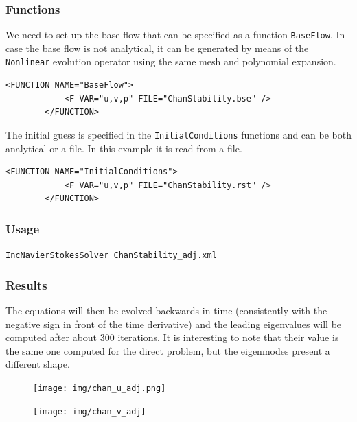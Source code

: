 \subsubsection{Functions}

We need to set up the base flow that can be specified as a function \texttt{BaseFlow}. In case the base flow is not analytical, it can be generated by means of the \texttt{Nonlinear} evolution operator using the same mesh and polynomial expansion.

    \begin{lstlisting}[style=XMLStyle]
        <FUNCTION NAME="BaseFlow">
            <F VAR="u,v,p" FILE="ChanStability.bse" />
        </FUNCTION>
  \end{lstlisting}

  The initial guess is specified in the \texttt{InitialConditions} functions and can be both analytical or a file. In this example it is read from a file.

      \begin{lstlisting}[style=XMLStyle]
        <FUNCTION NAME="InitialConditions">
            <F VAR="u,v,p" FILE="ChanStability.rst" />
        </FUNCTION>
          \end{lstlisting}

\subsubsection{Usage}

\texttt{IncNavierStokesSolver ChanStability\_adj.xml}

\subsubsection{Results}

The equations will then be evolved backwards in time (consistently with the negative sign in front of the time derivative) and the leading eigenvalues will be computed after about 300 iterations. It is interesting to note that their value is the same one computed for the direct problem, but the eigenmodes present a different shape.


\begin{figure}[!htbp]
\centering
 {\texttt{[image: img/chan\_u\_adj.png]}}
   \caption {}
\end{figure}

\begin{figure}[!htbp]
\centering
 {\texttt{[image: img/chan\_v\_adj]}}
    \caption {}
\end{figure}

